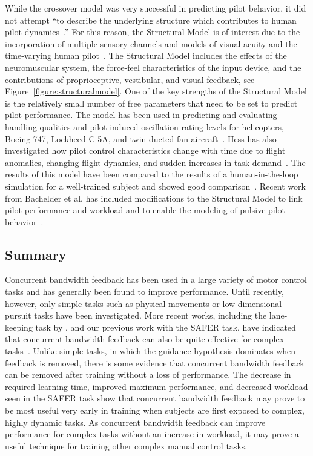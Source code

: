 While the crossover model was very successful in predicting pilot behavior, it did not attempt ``to describe the underlying structure which contributes to human pilot dynamics~\citep{hess_structural_1980}.''
For this reason, the Structural Model is of interest due to the incorporation of multiple sensory channels and models of visual acuity and the time-varying human pilot~\citep{hess_modeling_2009}.
The Structural Model includes the effects of the neuromuscular system, the force-feel characteristics of the input device, and the contributions of proprioceptive, vestibular, and visual feedback, see Figure~\ref{figure:structuralmodel}.
One of the key strengths of the Structural Model is the relatively small number of free parameters that need to be set to predict pilot performance.
The model has been used in predicting and evaluating handling qualities and pilot-induced oscillation rating levels for helicopters, Boeing 747, Lockheed C-5A, and twin ducted-fan aircraft~\citep{hess_analytical_2013, andreea-irina_prediction_2014, grant_handling_2015}.
Hess has also investigated how pilot control characteristics change with time due to flight anomalies, changing flight dynamics, and sudden increases in task demand~\citep{hess_modeling_2009, hess_modeling_2016}.
The results of this model have been compared to the results of a human-in-the-loop simulation for a well-trained subject and showed good comparison~\citep{hess_modeling_2016}.
Recent work from Bachelder et al. has included modifications to the Structural Model to link pilot performance and workload and to enable the modeling of pulsive pilot behavior~\citep{bachelder_modeling_2017, bachelder_linking_2018}.

\subsection{Summary}
Concurrent bandwidth feedback has been used in a large variety of motor control tasks and has generally been found to improve performance.
Until recently, however, only simple tasks such as physical movements or low-dimensional pursuit tasks have been investigated.
More recent works, including the lane-keeping task by \citeauthor{de_groot_effect_2011}, and our previous work with the SAFER task, have indicated that concurrent bandwidth feedback can also be quite effective for complex tasks~\citep{karasinski_real-time_2017}.
Unlike simple tasks, in which the guidance hypothesis dominates when feedback is removed, there is some evidence that concurrent bandwidth feedback can be removed after training without a loss of performance.
The decrease in required learning time, improved maximum performance, and decreased workload seen in the SAFER task show that concurrent bandwidth feedback may prove to be most useful very early in training when subjects are first exposed to complex, highly dynamic tasks.
As concurrent bandwidth feedback can improve performance for complex tasks without an increase in workload, it may prove a useful technique for training other complex manual control tasks.

